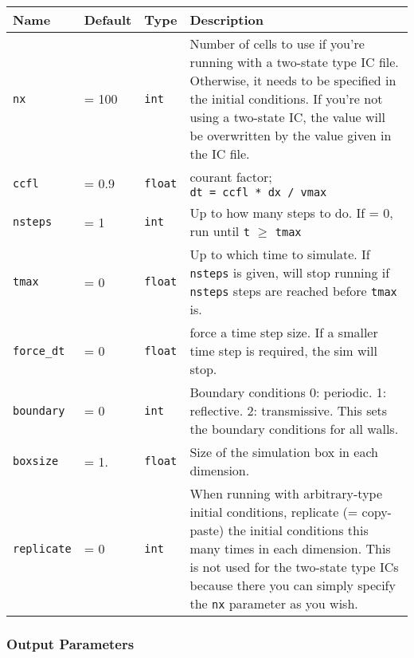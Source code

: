 \begin{tabular}[c]{p{2.5cm} p{1.5cm} p{} p{}}
Name & Default & Type & Description \\
\hline
\hline
\texttt{nx} &
    = 100 &
    \texttt{int} &
    Number of cells to use if you're running with a two-state type IC file.
    Otherwise, it needs to be specified in the initial conditions. If you're not
    using a two-state IC, the value will be overwritten by the value given in
    the IC file.
\\ \hline
\texttt{ccfl} &
    = 0.9 &
    \texttt{float} &
    courant factor; \texttt{dt\ =\ ccfl\ *\ dx\ /\ vmax}
\\ \hline
\texttt{nsteps} &
    = 1 &
    \texttt{int} &
    Up to how many steps to do. If = 0, run until \texttt{t}
    $\geq$ \texttt{tmax}
\\ \hline
\texttt{tmax} &
    = 0 &
    \texttt{float} &
    Up to which time to simulate. If \texttt{nsteps} is given, will stop running
    if \texttt{nsteps} steps are reached before \texttt{tmax} is.
\\ \hline
\texttt{force\_dt} &
    = 0 &
    \texttt{float} &
    force a time step size. If a smaller time step is required, the sim will
stop.
\\ \hline
\texttt{boundary} &
    = 0 &
    \texttt{int} &
    Boundary conditions 0: periodic. 1: reflective. 2: transmissive. This sets
    the boundary conditions for all walls.
\\ \hline
\texttt{boxsize} &
    = 1. &
    \texttt{float} &
    Size of the simulation box in each dimension.
\\ \hline
\texttt{replicate} &
    = 0 &
    \texttt{int} &
    When running with arbitrary-type initial conditions, replicate (=
    copy-paste) the initial conditions this many times in each dimension. This
    is not used for the two-state type ICs because there you can simply specify
    the \texttt{nx} parameter as you wish.
\\ \hline
\end{tabular}







\subsubsection{Output Parameters}

